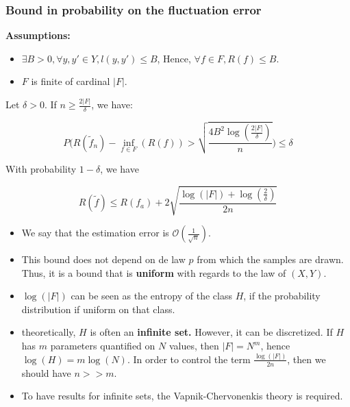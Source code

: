 \documentclass[
10pt, %
a4paper, %
oneside, %
headinclude,footinclude, %
BCOR5mm, %
]{scrartcl}
\begin{document}
    \subsubsection{\large\color{Periwinkle}Bound in probability on the fluctuation error}

    \begin{theorem}

	\textbf{{Assumptions:}} 
	\begin{itemize}
	    \item $\exists B>0, \forall y,y'\in Y, l(y,y')\leq B$, Hence, $\forall f\in F, R(f)\leq B$.
	    \item $ F $ is finite of cardinal $|F|$.
	\end{itemize}

	Let $\delta>0$. If $n\geq \frac{2|F|}{\delta} $, we have:



	\begin{equation*}
	    P\Big( R( \tilde{f}_n)-\inf_{f\in F}(R(f))> \sqrt{ \frac{4B^2 \log( \frac{2|F|}{\delta} )}{n} }  \Big)\leq \delta 
	\end{equation*}
    \end{theorem}

    \begin{corollary}
        
	With probability $ 1-\delta$, we have

	\begin{equation*}
	    R( \tilde{f})\leq R(f_a)+2 \sqrt{ \frac{ \log(|F|)+ \log( \frac{2}{\delta} )}{2n} } 
	\end{equation*}
    \end{corollary}

    \begin{remark}
	\begin{itemize}
	    \item We say that the estimation error is $ \mathcal{O} ( \frac{1}{ \sqrt{n} } )$.
	    \item This bound does not depend on de law $p$ from which the samples are drawn. Thus, it is a bound that is \textbf{{uniform}} with regards to the law of $ (X,Y)$.
	    \item $\log(|F|)$ can be seen as the entropy of the class $H$, if the probability distribution if uniform on that class.
	    \item theoretically, $H$ is often an \textbf{{infinite set.}} However, it can be discretized. If $H$ has $m$ parameters quantified on $N$ values, then $ |F| = N^m$, hence $\log(H)=m\log(N)$. In order to control the term $ \frac{\log(|F|)}{2n} $, then we should have $ n >> m$.
	    \item To have results for infinite sets, the Vapnik-Chervonenkis theory is required.
	\end{itemize}
    \end{remark}
\end{document}
